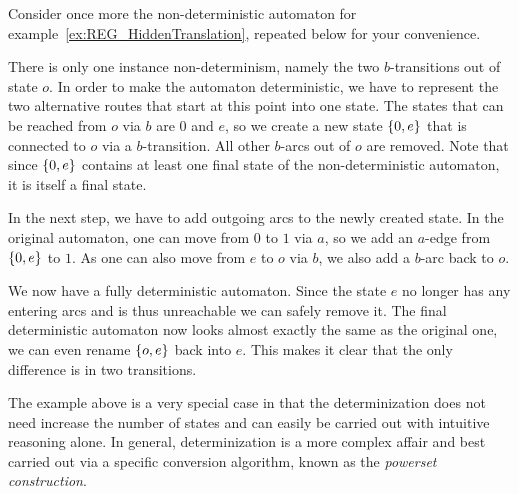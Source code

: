\begin{examplebox}
    Consider once more the non-deterministic automaton for example~\ref{ex:REG_HiddenTranslation}, repeated below for your convenience.
    \begin{center}
        
    \end{center}
    There is only one instance non-determinism, namely the two $b$-transitions out of state $o$.
    In order to make the automaton deterministic, we have to represent the two alternative routes that start at this point into one state.
    The states that can be reached from $o$ via $b$ are $0$ and $e$, so we create a new state $\left \{ 0,e \right \}$ that is connected to $o$ via a $b$-transition.
    All other $b$-arcs out of $o$ are removed.
    Note that since $\left \{ 0,e \right \}$ contains at least one final state of the non-deterministic automaton, it is itself a final state.
    \begin{center}
        
    \end{center}
    
    In the next step, we have to add outgoing arcs to the newly created state.
    In the original automaton, one can move from $0$ to $1$ via $a$, so we add an $a$-edge from $\left \{ 0,e \right \}$ to $1$.
    As one can also move from $e$ to $o$ via $b$, we also add a $b$-arc back to $o$.
    \begin{center}
        
    \end{center}
    
    We now have a fully deterministic automaton.
    Since the state $e$ no longer has any entering arcs and is thus unreachable we can safely remove it.
    The final deterministic automaton now looks almost exactly the same as the original one, we can even rename $\left \{ o,e \right \}$ back into $e$.
    This makes it clear that the only difference is in two transitions.
    \begin{center}
        
    \end{center}
\end{examplebox}

The example above is a very special case in that the determinization does not need increase the number of states and can easily be carried out with intuitive reasoning alone.
In general, determinization is a more complex affair and best carried out via a specific conversion algorithm, known as the \emph{powerset construction}.

